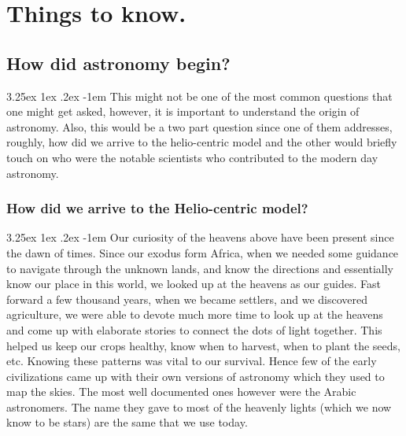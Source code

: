 \documentclass[a4paper,twoside,11pt]{article}
\makeatletter
\numberwithin{equation}{section}
\renewcommand\paragraph{\@startsection{paragraph}{5}{\z@}%
  {3.25ex \@plus1ex \@minus.2ex}%
  {-1em}%
  {\normalfont\normalsize\bfseries}}
\makeatother
\begin{document}
\section{Things to know.}
\subsection{How did astronomy begin?}
\paragraph{}
This might not be one of the most common questions that one might get asked, however, it is important to understand the origin of astronomy. Also, this would be a two part question since one of them addresses, roughly, how did we arrive to the helio-centric model and the other would briefly touch on who were the notable scientists who contributed to the modern day astronomy.
\subsubsection{How did we arrive to the Helio-centric model?}
\paragraph{}
Our curiosity of the heavens above have been present since the dawn of times. Since our exodus form Africa, when we needed some guidance to navigate through the unknown lands, and know the directions and essentially know our place in this world, we looked up at the heavens as our guides. Fast forward a few thousand years, when we became settlers, and we discovered agriculture, we were able to devote much more time to look up at the heavens and come up with elaborate stories to connect the dots of light together. This helped us keep our crops healthy, know when to harvest, when to plant the seeds, etc. Knowing these patterns was vital to our survival. Hence few of the early civilizations came up with their own versions of astronomy which they used to map the skies. The most well documented ones however were the Arabic astronomers. The name they gave to most of the heavenly lights (which we now know to be stars) are the same that we use today. 
\end{document}
